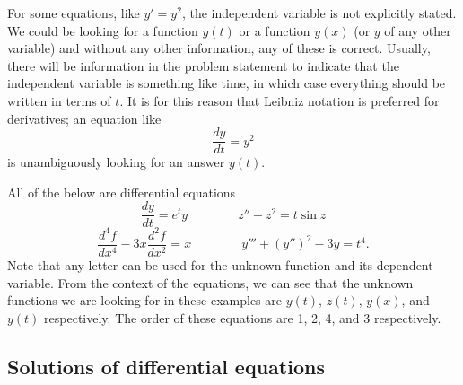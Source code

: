 For some equations, like $y' = y^2$, the independent variable is not explicitly stated. We could be looking for a function $y(t)$ or a function $y(x)$ (or $y$ of any other variable) and without any other information, any of these is correct. Usually, there will be information in the problem statement to indicate that the independent variable is something like time, in which case everything should be written in terms of $t$. It is for this reason that Leibniz notation is preferred for derivatives; an equation like
\[ \frac{dy}{dt} = y^2 \] is unambiguously looking for an answer $y(t)$.

\begin{example}
All of the below are differential equations
\begin{equation*}
\frac{dy}{dt} = e^t y \qquad \qquad z'' + z^2 = t\sin{z}
\end{equation*}
\begin{equation*}
\frac{d^4f}{dx^4} - 3x \frac{d^2f}{dx^2} = x \qquad \qquad y''' + (y'')^2 - 3y = t^4.
\end{equation*}
Note that any letter can be used for the unknown function and its dependent variable. From the context of the equations, we can see that the unknown functions we are looking for in these examples are $y(t)$, $z(t)$, $y(x)$, and $y(t)$ respectively. The order of these equations are 1, 2, 4, and 3 respectively. 
\end{example}


\subsection{Solutions of differential equations}

